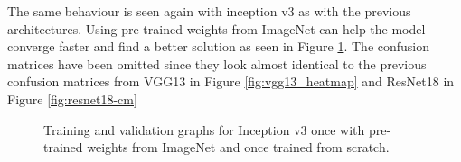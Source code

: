 \begin{table}[h] \centering
{}
\caption{Hyper parameters for inception v3 optimized with SigOpt. First row shows hyperparameters training the architecture from scratch. Second row used pre-trained weights from ImageNet}
\label{tbl:Inceptionv3_overview}
\end{table}

The same behaviour is seen again with inception v3 as with the previous architectures. Using pre-trained weights from ImageNet can help the model converge faster and find a better solution as seen in Figure \ref{fig:inception-graph}. The confusion matrices have been omitted since they look almost identical to the previous confusion matrices from VGG13 in Figure \ref{fig:vgg13_heatmap} and ResNet18 in Figure \ref{fig:resnet18-cm}

\begin{figure}[h]
\centering
\caption{Training and validation graphs for Inception v3 once with pre-trained weights from ImageNet and once trained from scratch.}
\label{fig:inception-graph}
\end{figure}

